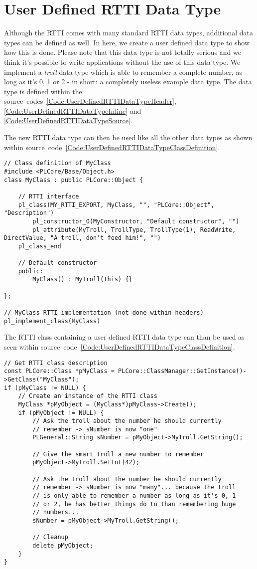 \chapter{User Defined RTTI Data Type}
\label{Appendix:UserDefinedRTTIDataType}
Although the RTTI comes with many standard RTTI data types, additional data types can be defined as well. In here, we create a user defined data type to show how this is done. Please note that this data type is not totally serious and we think it's possible to write applications without the use of this data type. We implement a \emph{troll} data type which is able to remember a complete number, as long as it's 0, 1 or 2 - in short: a completely useless example data type. The data type is defined within the source~codes~\ref{Code:UserDefinedRTTIDataTypeHeader}, \ref{Code:UserDefinedRTTIDataTypeInline} and \ref{Code:UserDefinedRTTIDataTypeSource}.

The new RTTI data type can then be used like all the other data types as shown within source~code~\ref{Code:UserDefinedRTTIDataTypeClassDefinition}.
\begin{lstlisting}[label=Code:UserDefinedRTTIDataTypeClassDefinition,caption={RTTI class using a user defined RTTI data type}]
// Class definition of MyClass
#include <PLCore/Base/Object.h>
class MyClass : public PLCore::Object {

	// RTTI interface
	pl_class(MY_RTTI_EXPORT, MyClass, "", "PLCore::Object", "Description")
		pl_constructor_0(MyConstructor, "Default constructor", "")
		pl_attribute(MyTroll, TrollType, TrollType(1), ReadWrite, DirectValue, "A troll, don't feed him!", "")
	pl_class_end

	// Default constructor
	public:
		MyClass() : MyTroll(this) {}

};

// MyClass RTTI implementation (not done within headers)
pl_implement_class(MyClass)
\end{lstlisting}
The RTTI class containing a user defined RTTI data type can than be used as seen within source~code~\ref{Code:UserDefinedRTTIDataTypeClassDefinition}.
\begin{lstlisting}[label=Code:UserDefinedRTTIDataTypeClassUsage,caption={Using a RTTI class containing a user defined RTTI data type}]
// Get RTTI class description
const PLCore::Class *pMyClass = PLCore::ClassManager::GetInstance()->GetClass("MyClass");
if (pMyClass != NULL) {
	// Create an instance of the RTTI class
	MyClass *pMyObject = (MyClass*)pMyClass->Create();
	if (pMyObject != NULL) {
		// Ask the troll about the number he should currently
		// remember -> sNumber is now "one"
		PLGeneral::String sNumber = pMyObject->MyTroll.GetString();

		// Give the smart troll a new number to remember
		pMyObject->MyTroll.SetInt(42);

		// Ask the troll about the number he should currently
		// remember -> sNumber is now "many"... because the troll
		// is only able to remember a number as long as it's 0, 1
		// or 2, he has better things do to than remembering huge
		// numbers...
		sNumber = pMyObject->MyTroll.GetString();

		// Cleanup
		delete pMyObject;
	}
}
\end{lstlisting}


